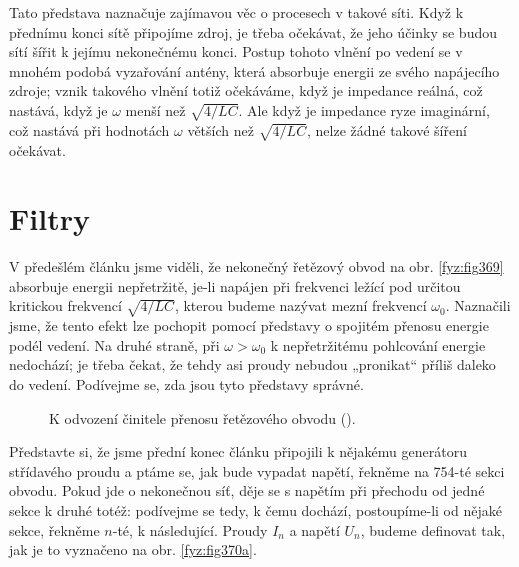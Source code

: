   Tato představa naznačuje zajímavou věc o procesech v takové síti. Když k přednímu konci sítě 
  připojíme zdroj, je třeba očekávat, že jeho účinky se budou sítí šířit k jejímu nekonečnému 
  konci. Postup tohoto vlnění po vedení se v mnohém podobá vyzařování antény, která absorbuje 
  energii ze svého napájecího zdroje; vznik takového vlnění totiž očekáváme, když je impedance 
  reálná, což nastává, když je \(\omega\) menší než \(\sqrt{4/LC}\). Ale když je impedance ryze 
  imaginární, což nastává při hodnotách \(\omega\) větších než \(\sqrt{4/LC}\), nelze žádné takové 
  šíření očekávat.

\section{Filtry}\label{fyz:IIchapXXIIsecVII}
  V předešlém článku jsme viděli, že nekonečný řetězový obvod na obr. \ref{fyz:fig369} absorbuje 
  energii nepřetržitě, je-li napájen při frekvenci ležící pod určitou kritickou frekvencí 
  \(\sqrt{4/LC}\), kterou budeme nazývat mezní frekvencí \(\omega_0\). Naznačili jsme, že tento 
  efekt lze pochopit pomocí představy o spojitém přenosu energie podél vedení. Na druhé straně, při 
  \(\omega>\omega_0\) k nepřetržitému pohlcování energie nedochází; je třeba čekat, že tehdy asi 
  proudy nebudou „pronikat“ příliš daleko do vedení. Podívejme se, zda jsou tyto představy správné.
  
  \begin{figure}[ht!] %
    \centering
     \newline
    \caption{K odvození činitele přenosu řetězového obvodu
             (\cite[s.~410]{Feynman02}).}
    \label{fyz:fig370}
  \end{figure}
  
  Představte si, že jsme přední konec článku připojili k nějakému generátoru střídavého proudu a 
  ptáme se, jak bude vypadat napětí, řekněme na \num{754}-té sekci obvodu. Pokud jde o nekonečnou 
  síť, děje se s napětím při přechodu od jedné sekce k druhé totéž: podívejme se tedy, k čemu 
  dochází, postoupíme-li od nějaké sekce, řekněme \(n\)-té, k následující. Proudy \(I_n\) a napětí 
  \(U_n\), budeme definovat tak, jak je to vyznačeno na obr. \ref{fyz:fig370a}.
  
